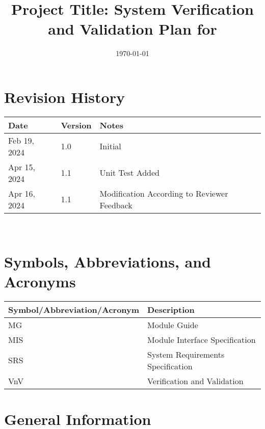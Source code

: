 \documentclass[12pt, titlepage]{article}
\begin{document}
\title{Project Title: System Verification and Validation Plan for \progname{}} 
\author{\authname}
\date{\today}
	
\maketitle


\section*{Revision History}

\begin{tabularx}{\textwidth}{p{3cm}p{2cm}X}
\toprule {\bf Date} & {\bf Version} & {\bf Notes}\\
\midrule
Feb 19, 2024 & 1.0 & Initial\\
Apr 15, 2024 & 1.1 & Unit Test Added\\
Apr 16, 2024 & 1.1 & Modification According to Reviewer Feedback\\
\bottomrule
\end{tabularx}

~\\
\newpage

\tableofcontents

\listoftables


\listoffigures


\newpage

\section{Symbols, Abbreviations, and Acronyms}

\renewcommand{\arraystretch}{1.2}
\begin{tabular}{ll}
\toprule
\textbf{Symbol/Abbreviation/Acronym} & \textbf{Description} \\
\midrule
MG & Module Guide \\
MIS & Module Interface Specification \\
SRS & System Requirements Specification \\
VnV & Verification and Validation \\
\bottomrule
\end{tabular}



\newpage



\section{General Information}
\end{document}
